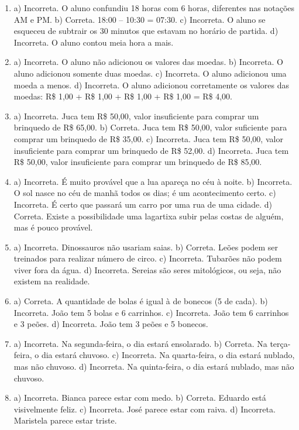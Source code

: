 \begin{enumerate}
\item
a) Incorreta. O aluno confundiu 18 horas com 6 horas, diferentes nas notações AM e PM.
b) Correta. 18:00 -- 10:30 = 07:30.
c) Incorreta. O aluno se esqueceu de subtrair os 30 minutos que estavam no horário de partida.
d) Incorreta. O aluno contou meia hora a mais.

\item
a) Incorreta. O aluno não adicionou os valores das moedas.
b) Incorreta. O aluno adicionou somente duas moedas.
c) Incorreta. O aluno adicionou uma moeda a menos.
d) Incorreta. O aluno adicionou corretamente os valores das moedas:
R\$ 1,00 + R\$ 1,00 + R\$ 1,00 + R\$ 1,00 = R\$ 4,00.

\item
a) Incorreta. Juca tem R\$ 50,00, valor insuficiente para comprar um brinquedo de R\$ 65,00.
b) Correta. Juca tem R\$ 50,00, valor suficiente para comprar um brinquedo de R\$ 35,00.
c) Incorreta. Juca tem R\$ 50,00, valor insuficiente para comprar um brinquedo de R\$ 52,00.
d) Incorreta. Juca tem R\$ 50,00, valor insuficiente para comprar um brinquedo de R\$ 85,00.

\item
a) Incorreta. É muito provável que a lua apareça no céu à noite.
b) Incorreta. O sol nasce no céu de manhã todos os dias; é um acontecimento certo.
c) Incorreta. É certo que passará um carro por uma rua de uma cidade.
d) Correta. Existe a possibilidade uma lagartixa subir pelas costas de alguém, mas é pouco provável.

\item
a) Incorreta. Dinossauros não usariam saias.
b) Correta. Leões podem ser treinados para realizar número de circo.
c) Incorreta. Tubarões não podem viver fora da água.
d) Incorreta. Sereias são seres mitológicos, ou seja, não existem na
realidade.

\item
a) Correta. A quantidade de bolas é igual à de bonecos (5 de cada).
b) Incorreta. João tem 5 bolas e 6 carrinhos.
c) Incorreta. João tem 6 carrinhos e 3 peões.
d) Incorreta. João tem 3 peões e 5 bonecos.

\item
a) Incorreta. Na segunda-feira, o dia estará ensolarado.
b) Correta. Na terça-feira, o dia estará chuvoso.
c) Incorreta. Na quarta-feira, o dia estará nublado, mas não chuvoso.
d) Incorreta. Na quinta-feira, o dia estará nublado, mas não chuvoso.

\item
a) Incorreta. Bianca parece estar com medo.
b) Correta. Eduardo está visivelmente feliz.
c) Incorreta. José parece estar com raiva.
d) Incorreta. Maristela parece estar triste.
\end{enumerate}

